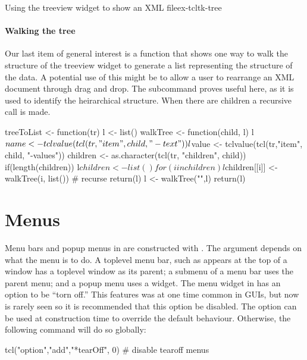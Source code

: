 \begin{example}{Using the treeview widget to show an XML file}{ex-tcltk-tree}
\paragraph{Walking the tree}
Our last item of general interest is a function that shows one way to
walk the structure of the treeview widget to generate a list
representing the structure of the data.  A potential use of this might
be to allow a user to rearrange an XML document through drag and drop.
The subcommand  proves useful here,
as it is used to identify the heirarchical structure. When there are children a recursive call is made.



\begin{Schunk}
\begin{Sinput}
 treeToList <- function(tr) {
   l <- list()
   walkTree <- function(child, l) {
     l$name <- tclvalue(tcl(tr,"item", child, "-text"))
     l$value <- tclvalue(tcl(tr,"item", child, "-values"))
     children <- as.character(tcl(tr, "children", child)) 
     if(length(children)) {
       l$children <- list()
       for(i in children) 
         l$children[[i]] <- walkTree(i, list()) # recurse
     }
     return(l)
   }
   l <- walkTree("",l)
   return(l)
 }
\end{Sinput}
\end{Schunk}
\end{example}



\section{Menus}
\label{sec:tcltk:menus}

Menu bars and popup menus in \Tk\/ are constructed with
. The  argument depends on what the menu is
to do. A toplevel menu bar, such as appears at the top of a window has
a toplevel window as its parent; a submenu of a menu bar uses the
parent menu; and a popup menu uses a widget.  The menu widget in \Tk\/
has an option to be ``torn off.'' This features was at one time common
in GUIs, but now is rarely seen so it is recommended that this option
be disabled. The  option can be used at
construction time to override the default behaviour. Otherwise, the
following command will do so globally:
\begin{Schunk}
\begin{Sinput}
 tcl("option","add","*tearOff", 0)       # disable tearoff menus
\end{Sinput}
\end{Schunk}

